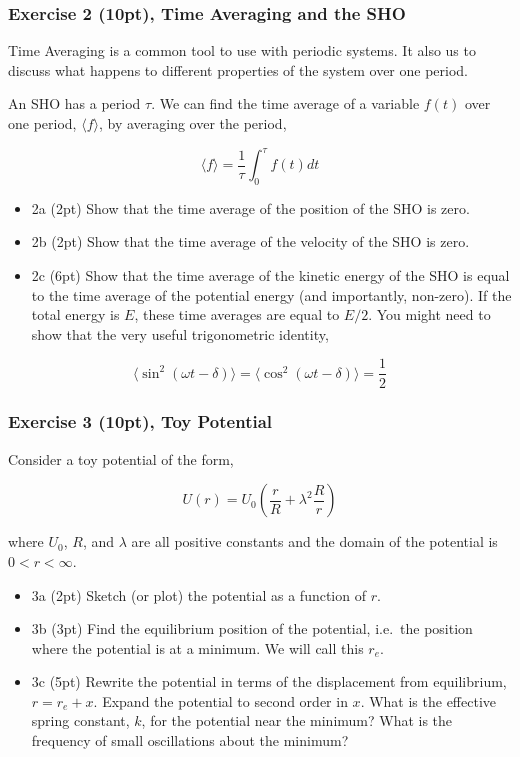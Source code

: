 \documentclass[11pt]{article}
\providecommand{\tightlist}{%
      \setlength{\itemsep}{0pt}\setlength{\parskip}{0pt}}
\begin{document}
    \subsubsection{Exercise 2 (10pt), Time Averaging and the
SHO}\label{exercise-2-10pt-time-averaging-and-the-sho}

Time Averaging is a common tool to use with periodic systems. It also us
to discuss what happens to different properties of the system over one
period.

An SHO has a period \(\tau\). We can find the time average of a variable
\(f(t)\) over one period, \(\langle f \rangle\), by averaging over the
period,

\[\langle f \rangle = \frac{1}{\tau}\int_0^\tau f(t)dt\]

\begin{itemize}
\tightlist
\item
  2a (2pt) Show that the time average of the position of the SHO is
  zero.
\item
  2b (2pt) Show that the time average of the velocity of the SHO is
  zero.
\item
  2c (6pt) Show that the time average of the kinetic energy of the SHO
  is equal to the time average of the potential energy (and importantly,
  non-zero). If the total energy is \(E\), these time averages are equal
  to \(E/2\). You might need to show that the very useful trigonometric
  identity,
\end{itemize}

\[\langle \sin^2(\omega t-\delta)\rangle = \langle \cos^2(\omega t-\delta)\rangle = \frac{1}{2}\]

    \subsubsection{Exercise 3 (10pt), Toy
Potential}\label{exercise-3-10pt-toy-potential}

Consider a toy potential of the form,

\[U(r) = U_0\left(\dfrac{r}{R}+\lambda^2\frac{R}{r}\right)\]

where \(U_0\), \(R\), and \(\lambda\) are all positive constants and the
domain of the potential is \(0<r<\infty\).

\begin{itemize}
\tightlist
\item
  3a (2pt) Sketch (or plot) the potential as a function of \(r\).
\item
  3b (3pt) Find the equilibrium position of the potential, i.e.~the
  position where the potential is at a minimum. We will call this
  \(r_e\).
\item
  3c (5pt) Rewrite the potential in terms of the displacement from
  equilibrium, \(r = r_e + x\). Expand the potential to second order in
  \(x\). What is the effective spring constant, \(k\), for the potential
  near the minimum? What is the frequency of small oscillations about
  the minimum?
\end{itemize}
\end{document}
